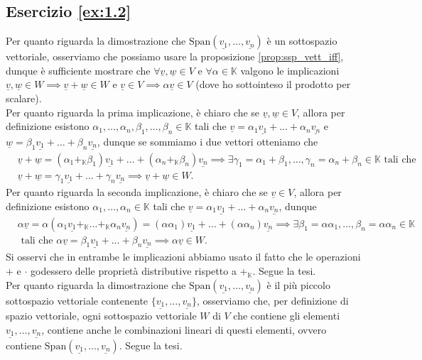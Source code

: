 \subsection*{Esercizio \ref{ex:1.2}}
Per quanto riguarda la dimostrazione che $\text{Span}(\underline{v_1}, \ldots, \underline{v_n})$ è un sottospazio vettoriale, osserviamo che possiamo usare la proposizione \ref{prop:ssp_vett_iff}, dunque è sufficiente mostrare che $\forall \underline{v}, \underline{w} \in V$ e $\forall \alpha \in \mathbb{K}$ valgono le implicazioni $\underline{v}, \underline{w} \in W \implies \underline{v}+\underline{w} \in W$ e $\underline{v} \in V \implies \alpha \underline{v} \in V$ (dove ho sottointeso il prodotto per scalare). \\
Per quanto riguarda la prima implicazione, è chiaro che se $\underline{v},\underline{w} \in V$, allora per definizione esistono $\alpha_1, \ldots, \alpha_n, \beta_1, \ldots, \beta_n \in \mathbb{K}$ tali che $\underline{v} = \alpha_1 \underline{v_1} + \ldots + \alpha_n \underline{v_n}$ e $\underline{w} = \beta_1 \underline{v_1} + \ldots + \beta_n \underline{v_n}$, dunque se sommiamo i due vettori otteniamo che
\begin{align}
    &\underline{v} + \underline{w} = (\alpha_1 +_\mathbb{K} \beta_1) \underline{v_1} + \ldots + (\alpha_n +_\mathbb{K} \beta_n) \underline{v_n} \implies \exists \gamma_1 = \alpha_1 + \beta_1, \ldots, \gamma_n = \alpha_n + \beta_n \in \mathbb{K} \text{ tali che } \\
    &\underline{v} + \underline{w} = \gamma_1 \underline{v_1} + \ldots + \gamma_n \underline{v_n} \implies \underline{v} + \underline{w} \in W.
\end{align}
Per quanto riguarda la seconda implicazione, è chiaro che se $\underline{v} \in V$, allora per definizione esistono $\alpha_1, \ldots, \alpha_n \in \mathbb{K}$ tali che $\underline{v} = \alpha_1 \underline{v_1} + \ldots + \alpha_n \underline{v_n}$, dunque
\begin{align}
    &\alpha \underline{v} = \alpha (\alpha_1 \underline{v_1} +_\mathbb{K} \ldots +_\mathbb{K} \alpha_n \underline{v_n}) = (\alpha \alpha_1) \underline{v_1} + \ldots + (\alpha \alpha_n) \underline{v_n} \implies \exists \beta_1 = \alpha \alpha_1, \ldots, \beta_n = \alpha \alpha_n \in \mathbb{K} \\
    &\text{ tali che } \alpha \underline{v} = \beta_1 \underline{v_1} + \ldots + \beta_n \underline{v_n} \implies \alpha \underline{v} \in W.
\end{align}
Si osservi che in entrambe le implicazioni abbiamo usato il fatto che le operazioni $+$ e $\cdot$ godessero delle proprietà distributive rispetto a $+_{\mathbb{K}}$. Segue la tesi. \\
Per quanto riguarda la dimostrazione che $\text{Span}(\underline{v_1}, \ldots, \underline{v_n})$ è il più piccolo sottospazio vettoriale contenente $\{\underline{v_1}, \ldots, \underline{v_n}\}$, osserviamo che, per definizione di spazio vettoriale, ogni sottospazio vettoriale $W$ di $V$ che contiene gli elementi $\underline{v_1}, \ldots, \underline{v_n}$, contiene anche le combinazioni lineari di questi elementi, ovvero contiene $\text{Span}(\underline{v_1}, \ldots, \underline{v_n})$. Segue la tesi.
